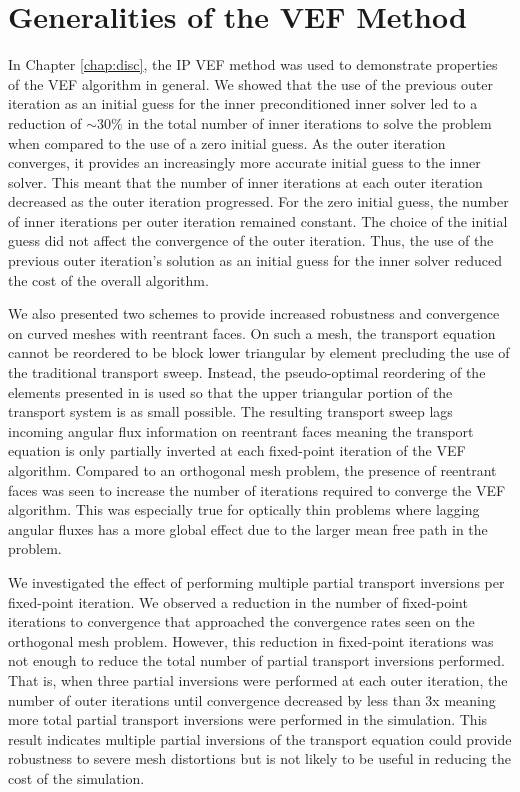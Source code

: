\documentclass[../doc.tex]{subfiles}
\begin{document}
\section{Generalities of the VEF Method}
In Chapter \ref{chap:disc}, the IP VEF method was used to demonstrate properties of the VEF algorithm in general. We showed that the use of the previous outer iteration as an initial guess for the inner preconditioned inner solver led to a reduction of $\sim 30\%$ in the total number of inner iterations to solve the problem when compared to the use of a zero initial guess.
As the outer iteration converges, it provides an increasingly more accurate initial guess to the inner solver. This meant that the number of inner iterations at each outer iteration decreased as the outer iteration progressed. For the zero initial guess, the number of inner iterations per outer iteration remained constant. 
The choice of the initial guess did not affect the convergence of the outer iteration. Thus, the use of the previous outer iteration's solution as an initial guess for the inner solver reduced the cost of the overall algorithm. 

We also presented two schemes to provide increased robustness and convergence on curved meshes with reentrant faces. On such a mesh, the transport equation cannot be reordered to be block lower triangular by element precluding the use of the traditional transport sweep. Instead, the pseudo-optimal reordering of the elements presented in \textcite{graph_sweeps} is used so that the upper triangular portion of the transport system is as small possible. The resulting transport sweep lags incoming angular flux information on reentrant faces meaning the transport equation is only partially inverted at each fixed-point iteration of the VEF algorithm. Compared to an orthogonal mesh problem, the presence of reentrant faces was seen to increase the number of iterations required to converge the VEF algorithm. This was especially true for optically thin problems where lagging angular fluxes has a more global effect due to the larger mean free path in the problem. 

We investigated the effect of performing multiple partial transport inversions per fixed-point iteration. We observed a reduction in the number of fixed-point iterations to convergence that approached the convergence rates seen on the orthogonal mesh problem. However, this reduction in fixed-point iterations was not enough to reduce the total number of partial transport inversions performed. That is, when three partial inversions were performed at each outer iteration, the number of outer iterations until convergence decreased by less than 3x meaning more total partial transport inversions were performed in the simulation. This result indicates multiple partial inversions of the transport equation could provide robustness to severe mesh distortions but is not likely to be useful in reducing the cost of the simulation. 
\end{document}
